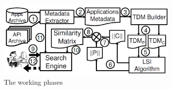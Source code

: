 

\begin{figure}[!h]
	\includegraphics[width=0.80\textwidth]{images/Clan.png}
	\centering
	\caption{The \CLAN working phases \cite{McMillan:2012:DSS:2337223.2337267}}
	\label{fig:CLAN}
\end{figure}


